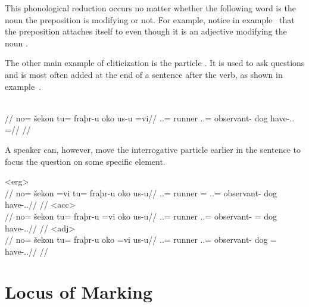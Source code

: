 This phonological reduction occurs no matter whether the following word is the noun the preposition is modifying or not. For example, notice in example~ that the preposition attaches itself to  even though it is an adjective modifying the noun .

The other main example of cliticization is the particle . It is used to ask questions and is most often added at the end of a sentence after the verb, as shown in example~.

	\begingl
		\glpreamble{}\\
		//
		\gla no= šekon tu= fraþr-u oko us-u =vi//
		\glb \An.\Sg.\Top{}= runner \An.\Sg.\Acc{}= observant-\An{} dog have-\Ind.\Npst.\Ipfv{} =\Int//
		\glft{}//
	\endgl
\xe

A speaker can, however, move the interrogative particle earlier in the sentence to focus the question on some specific element.

	\a<erg>\begingl
		\glpreamble{}\\
		//
		\gla no= šekon =vi tu= fraþr-u oko us-u//
		\glb \An.\Sg.\Top{}= runner =\Int{} \An.\Sg.\Acc{}= observant-\An{} dog have-\Ind.\Npst.\Ipfv//
		\glft{}//
	\endgl
	\a<acc>\begingl
		\glpreamble{}\\
		//
		\gla no= šekon tu= fraþr-u =vi oko us-u//
		\glb \An.\Sg.\Top{}= runner \An.\Sg.\Acc{}= observant-\An{} =\Int{} dog have-\Ind.\Npst.\Ipfv//
		\glft{}//
	\endgl
	\a<adj>\begingl
		\glpreamble{}\\
		//
		\gla no= šekon tu= fraþr-u oko =vi us-u//
		\glb \An.\Sg.\Top{}= runner \An.\Sg.\Acc{}= observant-\An{} dog =\Int{} have-\Ind.\Npst.\Ipfv//
		\glft{}//
	\endgl
\xe


\section{Locus of Marking}
\label{sec:tvk-locus}

